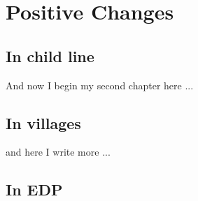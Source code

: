 \chapter{Positive Changes}
\ifpdf
    \graphicspath{{Chapter2/Chapter2Figs/PNG/}{Chapter2/Chapter2Figs/PDF/}{Chapter2/Chapter2Figs/}}
\else
    \graphicspath{{Chapter2/Chapter2Figs/EPS/}{Chapter2/Chapter2Figs/}}
\fi

\section{In child line}
And now I begin my second chapter here ...

\section{In villages}
and here I write more ...

\section{In EDP}






